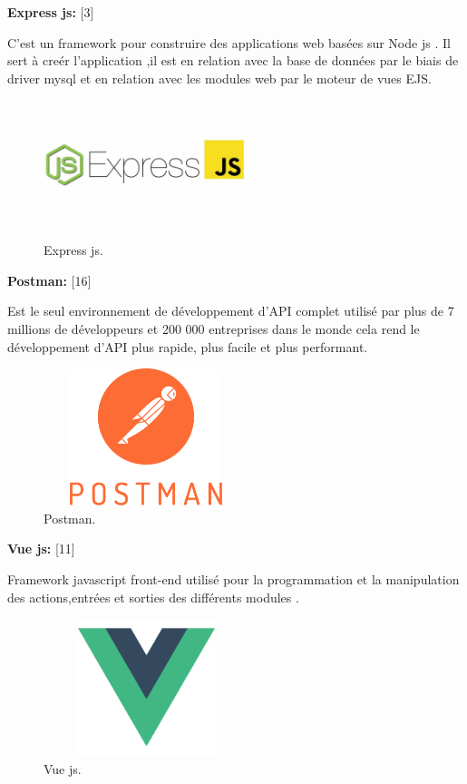 \textbf{ Express js:} [3]



 C'est un framework pour construire des
 applications web bas\'{e}es sur Node js .
 Il  sert \`{a} cre\'{e}r l'application ,il est en
relation avec la base de donn\'{e}es par le biais de driver mysql et en relation
avec les modules web par le moteur de vues EJS.\newline


\FloatBarrier
\begin{figure}[H]
\center
\includegraphics[width=6cm,height=4cm]{./figures/teklogos/express.png}
\caption{Express js.}
\end{figure}
\FloatBarrier




\textbf{ Postman:} [16]

Est le seul environnement de d\'{e}veloppement d'API complet utilis\'{e} par plus de 7 millions
de d\'{e}veloppeurs et 200 000 entreprises dans le monde
cela rend le d\'{e}veloppement d'API plus rapide,
 plus facile et plus performant.

\FloatBarrier
\begin{figure}[H]
\center
\includegraphics[width=6cm,height=4cm]{./figures/teklogos/postman.png}
\caption{Postman.}
\end{figure}
\FloatBarrier

\textbf{ Vue js:} [11]

Framework javascript front-end utilis\'{e} pour la programmation et la
manipulation des actions,entr\'{e}es et sorties des diff\'{e}rents modules . \newline
\FloatBarrier
\begin{figure}[H]
\center
\includegraphics[width=6cm,height=4cm]{./figures/teklogos/vue.png}
\caption{Vue js.}
\end{figure}
\FloatBarrier

